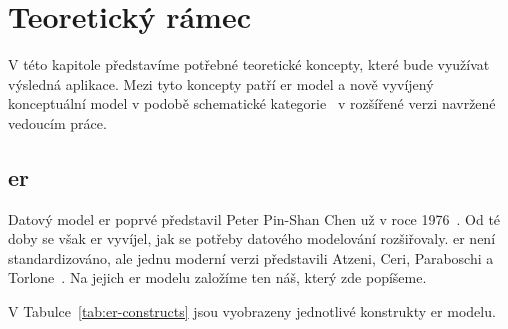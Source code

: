 \chapter{Teoretický rámec}\label{chapter:teorie}

V této kapitole představíme potřebné teoretické koncepty, které bude využívat výsledná aplikace.
Mezi tyto koncepty patří \acrfull{er} model a nově vyvíjený konceptuální model v podobě schematické kategorie~\cite{svoboda_categorical_2021} v rozšířené verzi navržené vedoucím práce.

\section{\acrlong{er}}\label{section:entity-relationship}

Datový model \acrfull{er} poprvé představil Peter Pin-Shan Chen už v roce 1976~\cite{chen_er_1976}.
Od té doby se však \acrshort{er} vyvíjel, jak se potřeby datového modelování rozšiřovaly.
\acrshort{er} není standardizováno, ale jednu moderní verzi představili Atzeni, Ceri, Paraboschi a Torlone~\cite[s.~163-179]{atzeni_database_1999}.
Na jejich \acrshort{er} modelu založíme ten náš, který zde popíšeme.

V Tabulce~\ref{tab:er-constructs} jsou vyobrazeny jednotlivé konstrukty \acrshort{er} modelu.


